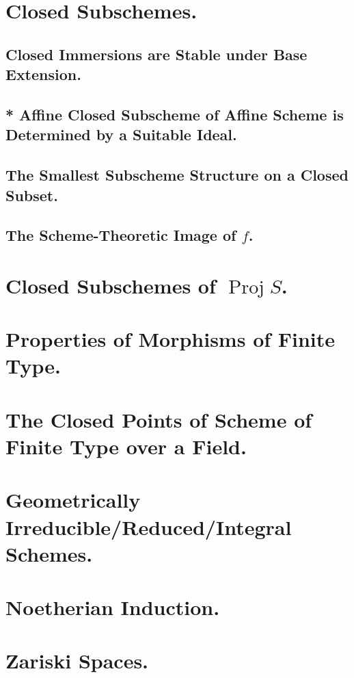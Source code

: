 \documentclass[a4paper]{jsarticle}
\newcommand{\Proj}{\operatorname{Proj}}
\begin{document}
\section{Closed Subschemes.} %
\subsection{Closed Immersions are Stable under Base Extension.}
\subsection{* Affine Closed Subscheme of Affine Scheme is Determined by a Suitable Ideal.}
\subsection{The Smallest Subscheme Structure on a Closed Subset.}
\subsection{The Scheme-Theoretic Image of $f$.}

\section{Closed Subschemes of $\Proj S$.} %

\section{Properties of Morphisms of Finite Type.} %

\section{The Closed Points of Scheme of Finite Type over a Field.} %

\section{Geometrically Irreducible/Reduced/Integral Schemes.} %

\section{Noetherian Induction.} %

\section{Zariski Spaces.} %
\end{document}
